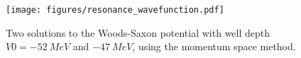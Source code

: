\begin{figure}
  \centering
  \texttt{[image: figures/resonance\_wavefunction.pdf]}
  \caption{Two solutions to the Woods-Saxon potential with well depth $V0=\SI{-52}{MeV}$ and $\SI{-47}{MeV}$, using the momentum space method.}
  \label{fig:resonance wavefunction}
\end{figure}


